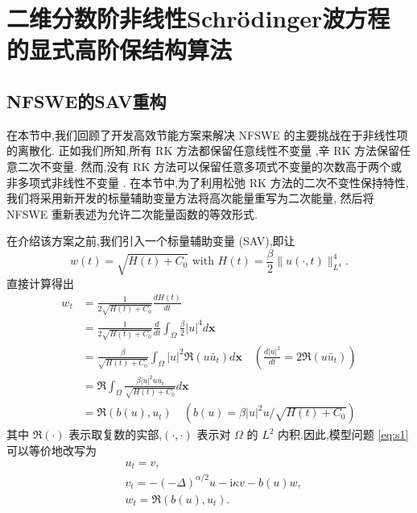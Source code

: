 \chapter[二维分数阶非线性Schr{\"o}dinger波方程的显式高阶保结构算法]{二维分数阶非线性Schr{\"o}dinger波方程的显式高阶保结构算法}

\section{NFSWE的SAV重构}\label{Section 2}
在本节中,我们回顾了开发高效节能方案来解决 NFSWE 的主要挑战在于非线性项的离散化.
正如我们所知,所有 RK 方法都保留任意线性不变量 \cite{griffithsNumericalMethodsOrdinary2010},辛 RK 方法保留任意二次不变量\cite{cooperStabilityRungeKuttaMethods1987}.
然而,没有 RK 方法可以保留任意多项式不变量的次数高于两个或非多项式非线性不变量 \cite{calvoNumericalSolutionIsospectral1997}.
在本节中,为了利用松弛 RK 方法的二次不变性保持特性,我们将采用新开发的标量辅助变量方法将高次能量重写为二次能量,
然后将 NFSWE 重新表述为允许二次能量函数的等效形式.

在介绍该方案之前,我们引入一个标量辅助变量 (SAV),即让
\begin{equation}
	w(t)=\sqrt{H(t)+C_0} \text { with } H(t)=\frac{\beta}{2}\|u(\cdot, t)\|_{L^{4}}^{4} .
\end{equation}
直接计算得出
\begin{equation}
	   \begin{aligned}
		w_t & =\frac{1}{2 \sqrt{H(t)+C_0}} \frac{d H(t)}{d t} \\
		& =\frac{1}{2 \sqrt{H(t)+C_0}} \frac{d}{d t} \int_{\Omega} \frac{\beta}{2}|u|^{4}d \boldsymbol{x} \\
		& =\frac{\beta}{\sqrt{H(t)+C_0}} \int_{\Omega} |u|^2 \Re\left(u \bar{u}_t\right) d \boldsymbol{x} \quad\left(\frac{d|u|^2}{d t}=2 \Re\left(u \bar{u}_t\right)\right) \\
		& =\Re \int_{\Omega} \frac{\beta|u|^2 u \bar{u}_t}{\sqrt{H(t)+C_0}} d \boldsymbol{x} \\
		& =\Re\left(b(u), u_t\right) \quad\left(b(u)=\beta|u|^2 u / \sqrt{H(t)+C_0}\right)
		\end{aligned}\label{eq:2-1}
\end{equation}
其中 $\Re(\cdot)$ 表示取复数的实部,$(\cdot, \cdot)$ 表示对 $\Omega$ 的 $L^2$ 内积.因此,模型问题 \eqref{eq:s1} 可以等价地改写为
\begin{align}
& u_t=v, \label{eq:2-2}\\
& v_t=-(-\Delta)^{\alpha / 2} u-\mathrm{i}\kappa v-b(u) w, \label{eq:2-3}\\
& w_t=\Re\left(b(u), u_t\right) .\label{eq:2-4}
\end{align}

